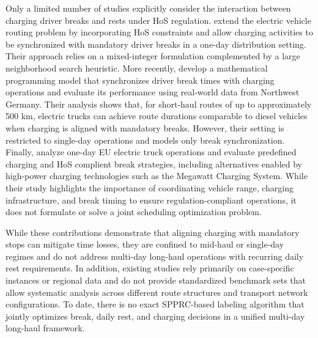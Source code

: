 \documentclass[3p,11pt,authoryear]{elsarticle}  %
\begin{document}
Only a limited number of studies explicitly consider the interaction between charging driver breaks and rests under HoS regulation. \citet{schiffer2017impact} extend the electric vehicle routing problem by incorporating HoS constraints and allow charging activities to be synchronized with mandatory driver breaks in a one-day distribution setting. Their approach relies on a mixed-integer formulation complemented by a large neighborhood search heuristic. More recently, \citet{brockmann2025} develop a mathematical programming model that synchronizes driver break times with charging operations and evaluate its performance using real-world data from Northwest Germany. Their analysis shows that, for short-haul routes of up to approximately 500 km, electric trucks can achieve route durations comparable to diesel vehicles when charging is aligned with mandatory breaks. However, their setting is restricted to single-day operations and models only break synchronization.
Finally, \citet{schneider2023novel} analyze one-day EU electric truck operations and evaluate predefined charging and HoS complient break strategies, including alternatives enabled by high-power charging technologies such as the Megawatt Charging System. While their study highlights the importance of coordinating vehicle range, charging infrastructure, and break timing to ensure regulation-compliant operations, it does not formulate or solve a joint scheduling optimization problem.

While these contributions demonstrate that aligning charging with mandatory stops can mitigate time losses, they are confined to mid-haul or single-day regimes and do not address multi-day long-haul operations with recurring daily rest requirements. In addition, existing studies rely primarily on case-specific instances or regional data and do not provide standardized benchmark sets that allow systematic analysis across different route structures and transport network configurations. To date, there is no exact SPPRC-based labeling algorithm that jointly optimizes break, daily rest, and charging decisions in a unified multi-day long-haul framework.
\end{document}
